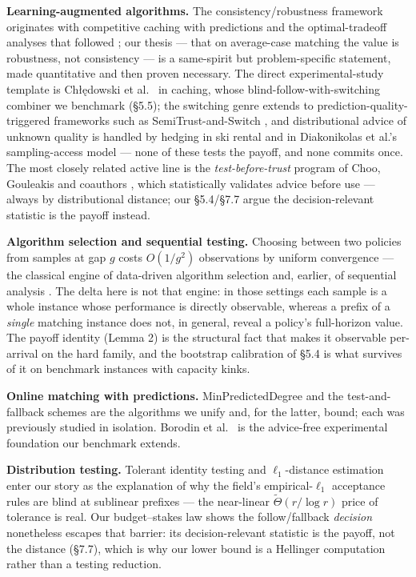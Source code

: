 \textbf{Learning-augmented algorithms.} The consistency/robustness
framework originates with competitive caching with predictions
\cite{lykouris2018caching} and the optimal-tradeoff analyses that
followed \cite{weizhang2020tradeoffs}; our thesis --- that on
average-case matching the value is robustness, not consistency --- is a
same-spirit but problem-specific statement, made quantitative and then
proven necessary. The direct experimental-study template is Chłędowski
et al.~\cite{chledowski2021caching} in caching, whose
blind-follow-with-switching combiner we benchmark (§5.5); the switching
genre extends to prediction-quality-triggered frameworks such as
SemiTrust-and-Switch \cite{antoniadis2025switching}, and distributional
advice of unknown quality is handled by hedging in ski rental
\cite{cui2026skirental} and in Diakonikolas et al.'s sampling-access
model --- none of these tests the payoff, and none commits once. The
most closely related active line is the \emph{test-before-trust} program
of Choo, Gouleakis and coauthors
\cite{choo2024imperfect,bhattacharyya2025product}, which statistically
validates advice before use --- always by distributional distance; our
§5.4/§7.7 argue the decision-relevant statistic is the payoff instead.

\textbf{Algorithm selection and sequential testing.} Choosing between
two policies from samples at gap \(g\) costs \(O(1/g^2)\) observations
by uniform convergence --- the classical engine of data-driven algorithm
selection \cite{gupta2017pac,balcan2020datadriven} and, earlier, of
sequential analysis \cite{wald1947sequential}. The delta here is not
that engine: in those settings each sample is a whole instance whose
performance is directly observable, whereas a prefix of a \emph{single}
matching instance does not, in general, reveal a policy's full-horizon
value. The payoff identity (Lemma 2) is the structural fact that makes
it observable per-arrival on the hard family, and the bootstrap
calibration of §5.4 is what survives of it on benchmark instances with
capacity kinks.

\textbf{Online matching with predictions.} MinPredictedDegree
\cite{aci2022mpd} and the test-and-fallback schemes
\cite{choo2024imperfect,bem2026testmatch} are the algorithms we unify
and, for the latter, bound; each was previously studied in isolation.
Borodin et al.~\cite{borodin2018experimental} is the advice-free
experimental foundation our benchmark extends.

\textbf{Distribution testing.} Tolerant identity testing
\cite{canonne2022tolerance,valiant2011unseen} and \(\ell_1\)-distance
estimation \cite{jiao2018l1} enter our story as the explanation of why
the field's empirical-\(\ell_1\) acceptance rules are blind at sublinear
prefixes --- the near-linear \(\tilde\Theta(r/\log r)\) price of
tolerance is real. Our budget--stakes law shows the follow/fallback
\emph{decision} nonetheless escapes that barrier: its decision-relevant
statistic is the payoff, not the distance (§7.7), which is why our lower
bound is a Hellinger computation rather than a testing reduction.

